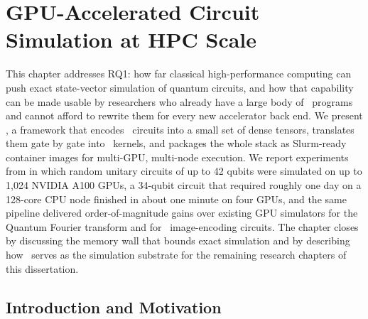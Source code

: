 \chapter{GPU-Accelerated Circuit Simulation at HPC Scale}\label{ch:qgear}


This chapter addresses RQ1: how far classical high-performance computing can push exact state-vector simulation of quantum circuits, and how that capability can be made usable by researchers who already have a large body of \qiskit\ programs and cannot afford to rewrite them for every new accelerator back end. We present \qgear, a framework that encodes \qiskit\ circuits into a small set of dense tensors, translates them gate by gate into \cudaq\ kernels, and packages the whole stack as Slurm-ready container images for multi-GPU, multi-node execution. We report experiments from \cite{guo2025qgear} in which random unitary circuits of up to 42 qubits were simulated on up to 1,024 NVIDIA A100 GPUs, a 34-qubit circuit that required roughly one day on a 128-core CPU node finished in about one minute on four GPUs, and the same pipeline delivered order-of-magnitude gains over existing GPU simulators for the Quantum Fourier transform and for \qcrank\ image-encoding circuits. The chapter closes by discussing the memory wall that bounds exact simulation and by describing how \qgear\ serves as the simulation substrate for the remaining research chapters of this dissertation.

\section{Introduction and Motivation}\label{sec:qgear:intro}


